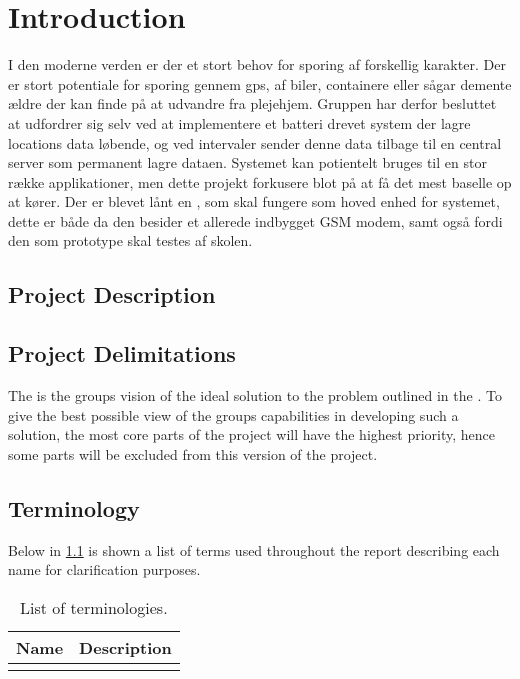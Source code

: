 
\chapter{Introduction}
\label{sec:introduction}
I den moderne verden er der et stort behov for sporing af forskellig karakter. Der er stort potentiale for sporing gennem gps, af biler, containere eller sågar demente ældre der kan finde på at udvandre fra plejehjem. 
Gruppen har derfor besluttet at udfordrer sig selv ved at implementere et batteri drevet system der lagre locations data løbende, og ved intervaler sender denne data tilbage til en central server som permanent lagre dataen. Systemet kan potientelt bruges til en stor række applikationer, men dette projekt forkusere blot på at få det mest baselle op at kører.
Der er blevet lånt en \MKR, som skal fungere som hoved enhed for systemet, dette er både da den besider et allerede indbygget GSM modem, samt også fordi den som prototype skal testes af skolen.

\section{Project Description}
\label{sec:projectDescription}


\section{Project Delimitations}
\label{sec:delimitations}
The  is the groups vision of the ideal solution to the problem outlined in the .  
To give the best possible view of the groups capabilities in developing such a solution, the most core parts of the project will have the highest priority, hence some parts will be excluded from this version of the project.

\section{Terminology}
\label{sec:terminology}
Below in \cref{tab:terminology} is shown a list of terms used throughout the report describing each name for clarification purposes.

\begin{table}[H]
	\centering
	\begin{tabularx}{0.8\textwidth}{l X}
		\toprule
		\textbf{Name} & \textbf{Description} \\
		\midrule
		&\\
		\bottomrule
	\end{tabularx}
	\caption{List of terminologies.}
	\label{tab:terminology}
\end{table}
